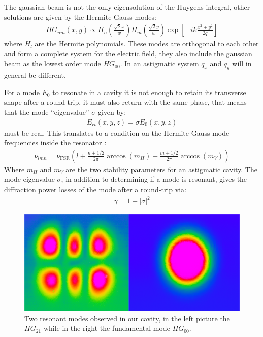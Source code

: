 The gaussian beam is not the only eigensolution of the Huygens integral, other solutions are given by the Hermite-Gauss modes:
\begin{align}
HG_{nm}(x,y)  \propto H_n\left(\frac{\sqrt{2}x}{w}\right)H_m\left(\frac{\sqrt{2}y}{w}\right)\exp\left[-ik\frac{x^2+y^2}{2q}\right]
\label{eq:HG}
\end{align}
where $H_l$ are the Hermite polynomials. These modes are orthogonal to each other and form a complete system for the electric field, they also include the gaussian beam as the lowest order mode $HG_{00}$. In an astigmatic system $q_x$ and $q_y$ will in general be different.

For a mode $E_0$ to resonate in a cavity it is not enough to retain its transverse shape after a round trip, it must also return with the same phase, that means that the mode ``eigenvalue'' $\sigma$ given by:
\begin{align}
E_{rt}(x,y,z) = \sigma E_0(x,y,z)
\end{align}
must be real. This translates to a condition on the Hermite-Gauss mode frequencies inside the resonator \parencite{siegman86}:
\begin{align}
	\nu_{lmn} = \nu_{\mathrm{FSR}}\left(l+\frac{n+1/2}{2\pi}\arccos(m_H)+\frac{m+1/2}{2\pi}\arccos(m_V)\right) 
\end{align}
Where $m_H$ and $m_V$ are the two stability parameters for an astigmatic cavity.
The mode eigenvalue $\sigma$, in addition to determining if a mode is resonant, gives the diffraction power losses of the mode after a round-trip via:
\begin{align}
	\gamma = 1- |\sigma|^2
\end{align}
\begin{figure}
	\centering
	\includegraphics[width=1\linewidth]{images/modi.png}
	\caption{Two resonant modes observed in our cavity, in the left picture the $HG_{21}$ while in the right the fundamental mode $HG_{00}$.}
	\label{fig:modi}
\end{figure}

